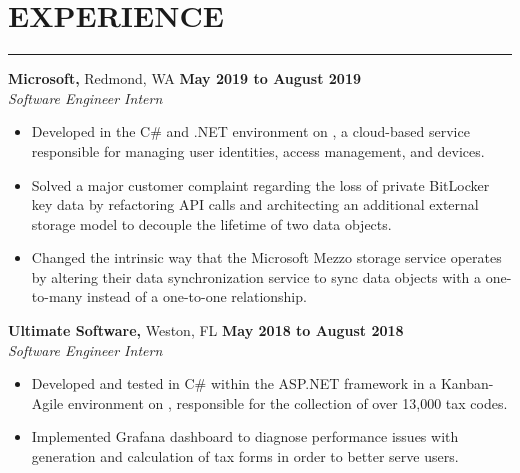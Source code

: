 \section*{EXPERIENCE}

\hrule \relax
\sectionheaderspace

\noindent \textbf{Microsoft,} Redmond, WA \hfill\textbf{May 2019 to August 2019}\\
\textit{Software Engineer Intern}
\begin{itemize}[noitemsep,nolistsep, label = {-}]
	\item Developed in the C\# and .NET environment on , a cloud-based service responsible for managing user identities, access management, and devices.
	\item Solved a major customer complaint regarding the loss of private BitLocker key data by refactoring API calls and architecting an additional external storage model to decouple the lifetime of two data objects.
	\item Changed the intrinsic way that the Microsoft Mezzo storage service operates by altering their data synchronization service to sync data objects with a one-to-many instead of a one-to-one relationship.
\end{itemize}
\subsectionspace

\noindent \textbf{Ultimate Software,} Weston, FL \hfill\textbf{May 2018 to August 2018}\\
\textit{Software Engineer Intern}
\begin{itemize}[noitemsep,nolistsep, label = {-}]
	\item Developed and tested in C\# within the ASP.NET framework in a Kanban-Agile environment on , responsible for the collection of over 13,000 tax codes.
	\item Implemented Grafana dashboard to diagnose performance issues with generation and calculation of tax forms in order to better serve users.
\end{itemize}
\subsectionspace